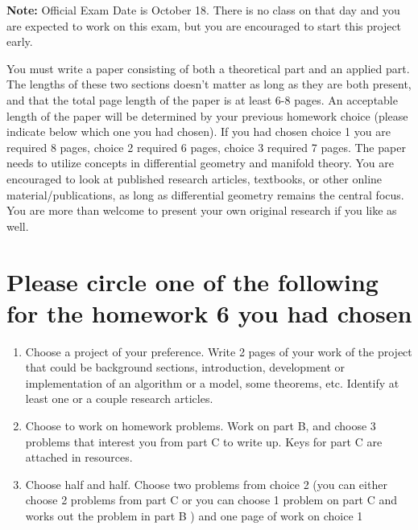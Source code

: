 \documentclass[12pt]{article}
\title{\rightline {\Huge {Due: Wednesday, October 23}}}
\author{\LARGE {HMC\quad Math 142 \quad Midterm Exam Fall 2017} 
\\ Prof. Gu
}
\begin{document}
\maketitle
\textbf{Note:} Official Exam Date is October 18. There is no class on that day and you are expected to work on this exam, but you are encouraged to start this project early.


You must write a paper consisting of both a theoretical part and an applied part.  The lengths of these two sections doesn't matter as long as they are both present, and that the total page length of the paper is at least 6-8 pages.  An acceptable length of the paper will be determined by your previous homework choice (please indicate below which one you had chosen). If you had chosen choice 1 you are required 8 pages, choice 2 required 6 pages, choice 3 required 7 pages. The paper needs to utilize concepts in differential geometry and manifold theory.  You are encouraged to look at published research articles, textbooks, or other online material/publications, as long as differential geometry remains the central focus.  You are more than welcome to present your own original research if you like as well.




\section*{ Please circle one of the following for the homework 6 you had chosen}
\begin{enumerate}
    \item Choose a project of your preference. Write 2 pages of your work of the project that could be background sections, introduction, development or implementation of an algorithm or a model, some theorems, etc.  Identify at least one or a couple research articles. 
    
    \item Choose to work on homework problems. Work on part B, and choose 3 problems that interest you from part C to write up. Keys for part C are attached in resources.
    \item Choose half and half. Choose two problems from choice 2 (you can either choose 2 problems from part C or you can choose 1 problem on part C and works out the problem in part B ) and one page of work on choice 1
\end{enumerate}
\end{document}
